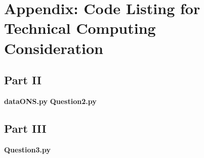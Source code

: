 \documentclass{mthree}
\begin{document}
    
    \newpage
    \section{Appendix: Code Listing for Technical Computing Consideration}
        
        
        \subsection{Part II}
            \textbf{dataONS.py}
            \newpage
            \textbf{Question2.py}
            
            \newpage
        \subsection{Part III}
            \textbf{Question3.py}
        
\end{document}
